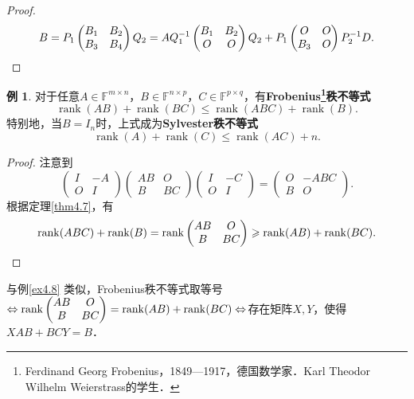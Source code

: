 \documentclass[a4paper,fontset=windows]{ctexbook}
\theoremstyle{definition}
\newtheorem{example}{例}[chapter]
\DeclareMathOperator{\rank}{rank}
\renewcommand{\le}{\leqslant}
\renewcommand{\ge}{\geqslant}
\begin{document}
\begin{proof}
\begin{equation*}
B=P_1\begin{pmatrix}B_1&B_2 \\ B_3&B_4\end{pmatrix}Q_2=AQ_1^{-1}\begin{pmatrix}B_1&B_2 \\ O&O\end{pmatrix}Q_2+P_1\begin{pmatrix}O&O \\ B_3&O\end{pmatrix}P_2^{-1}D. \qedhere
\end{equation*}
\end{proof}

\begin{example}\label{ex4.9}
对于任意$A\in\mathbb{F}^{m\times n}$，$B\in\mathbb{F}^{n\times p}$，$C\in\mathbb{F}^{p\times q}$，有{\bf Frobenius\footnote{Ferdinand Georg Frobenius，1849—1917，德国数学家．Karl Theodor Wilhelm Weierstrass的学生．}秩不等式}
$$\rank(AB)+\rank(BC)\le\rank(ABC)+\rank(B).$$
特别地，当$B=I_n$时，上式成为{\bf Sylvester秩不等式}
$$\rank(A)+\rank(C)\le\rank(AC)+n.$$
\end{example}

\begin{proof}
注意到
$$\begin{pmatrix}I&-A \\ O&I\end{pmatrix}\begin{pmatrix}AB&O \\ B&BC\end{pmatrix}\begin{pmatrix}I&-C \\ O&I\end{pmatrix}=\begin{pmatrix}O&-ABC \\ B&O\end{pmatrix}.$$
根据定理\ref{thm4.7}，有
\begin{equation*}
\rank(ABC)+\rank(B)=\rank\begin{pmatrix}AB&O \\ B&BC\end{pmatrix}\ge\rank(AB)+\rank(BC). \qedhere
\end{equation*}
\end{proof}

与例\ref{ex4.8} 类似，Frobenius秩不等式取等号$\Leftrightarrow\rank\begin{pmatrix}AB&O \\ B&BC\end{pmatrix}=\rank(AB)+\rank(BC)\linebreak\Leftrightarrow$存在矩阵$X,Y$，使得$XAB+BCY=B$．
\end{document}
